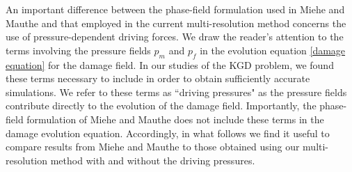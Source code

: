 An important difference between the phase-field formulation used in Miehe and Mauthe \cite{miehe2015minimization, miehe2016phase} and that employed in the current multi-resolution method concerns the use of pressure-dependent driving forces.  We draw the reader's attention to the terms involving the pressure fields $p_m$ and $p_f$ in the evolution equation \eqref{damage equation} for the damage field.  In our studies of the KGD problem, we found these terms necessary to include in order to obtain sufficiently accurate simulations.  We refer to these terms as ``driving pressures" as the pressure fields contribute directly to the evolution of the damage field.  Importantly, the phase-field formulation of Miehe and Mauthe \cite{miehe2015minimization, miehe2016phase} does not include these terms in the damage evolution equation.   Accordingly, in what follows we find it useful to compare results from Miehe and Mauthe \cite{miehe2015minimization, miehe2016phase} to those obtained using our multi-resolution method with and without the driving pressures.  

